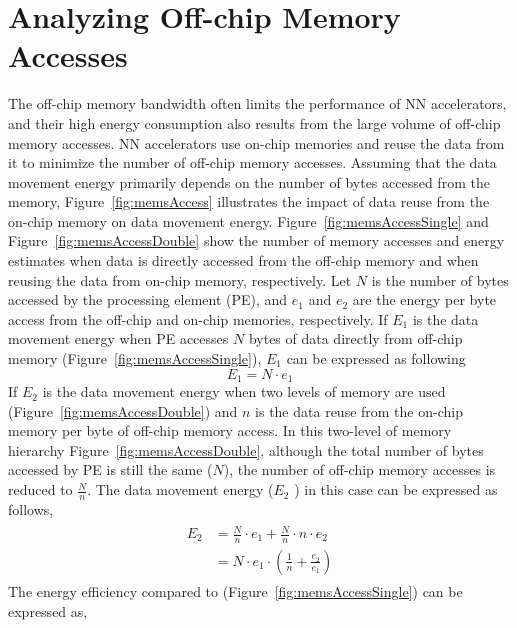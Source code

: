 \graphicspath{{./Ch2-AnalyticalFw/images/}}

\chapter{Analyzing Off-chip Memory Accesses} \label{chap:analyticalFw}
The off-chip memory bandwidth often limits the performance of NN accelerators, and their high energy consumption also results from the large volume of off-chip memory accesses. NN accelerators use on-chip memories and reuse the data from it to minimize the number of off-chip memory accesses. Assuming that the data movement energy primarily depends on the number of bytes accessed from the memory, Figure~\ref{fig:memsAccess} illustrates the impact of data reuse from the on-chip memory on data movement energy. Figure~\ref{fig:memsAccessSingle} and Figure~\ref{fig:memsAccessDouble} show the number of memory accesses and energy estimates when data is directly accessed from the off-chip memory and when reusing the data from on-chip memory, respectively. Let $N$ is the number of bytes accessed by the processing element (PE), and $e_{1}$ and $e_{2}$ are the energy per byte access from the off-chip and on-chip memories, respectively. If $E_1$ is the data movement energy when PE accesses $N$ bytes of data directly from off-chip memory (Figure~\ref{fig:memsAccessSingle}), $E_1$ can be expressed as following
\begin{equation}\label{eq:E_1} 
	E_{1}= N\cdot e_1
\end{equation}
If $E_2$ is the data movement energy when two levels of memory are used (Figure~\ref{fig:memsAccessDouble}) and $n$ is the data reuse from the on-chip memory per byte of off-chip memory access. In this two-level of memory hierarchy Figure~\ref{fig:memsAccessDouble}, although the total number of bytes accessed by PE is still the same ($N$), the number of off-chip memory accesses is reduced to $\frac{N}{n}$. The data movement energy ($E_2$ ) in this case can be expressed as follows,
\begin{align}\label{eq:E_2}
	\begin{split}
	E_{2}&= \frac{N}{n}\cdot e_1 + \frac{N}{n}\cdot n\cdot e_2 \\
	&= N\cdot e_1\cdot (\frac{1}{n}+ \frac{e_2}{e_1})
	\end{split}
\end{align}
The energy efficiency compared to (Figure~\ref{fig:memsAccessSingle}) can be expressed as, 

